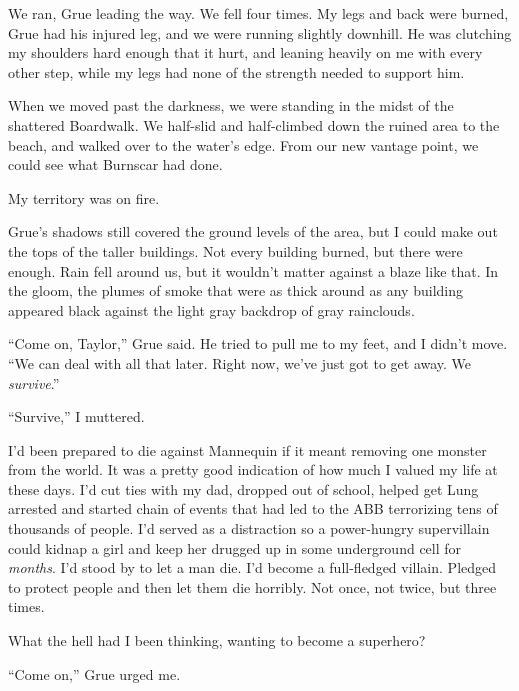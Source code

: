 We ran, Grue leading the way.  We fell four times.  My legs and back were burned, Grue had his injured leg, and we were running slightly downhill.  He was clutching my shoulders hard enough that it hurt, and leaning heavily on me with every other step, while my legs had none of the strength needed to support him.



When we moved past the darkness, we were standing in the midst of the shattered Boardwalk.  We half-slid and half-climbed down the ruined area to the beach, and walked over to the water's edge.  From our new vantage point, we could see what Burnscar had done.



My territory was on fire.



Grue's shadows still covered the ground levels of the area, but I could make out the tops of the taller buildings.  Not every building burned, but there were enough.  Rain fell around us, but it wouldn't matter against a blaze like that.  In the gloom, the plumes of smoke that were as thick around as any building appeared black against the light gray backdrop of gray rainclouds.



``Come on, Taylor,'' Grue said.  He tried to pull me to my feet, and I didn't move.  ``We can deal with all that later.  Right now, we've just got to get away.  We \emph{survive}.''



``Survive,'' I muttered.



I'd been prepared to die against Mannequin if it meant removing one monster from the world.  It was a pretty good indication of how much I valued my life at these days.  I'd cut ties with my dad, dropped out of school, helped get Lung arrested and started chain of events that had led to the ABB terrorizing tens of thousands of people.  I'd served as a distraction so a power-hungry supervillain could kidnap a girl and keep her drugged up in some underground cell for \emph{months}.  I'd stood by to let a man die.  I'd become a full-fledged villain.  Pledged to protect people and then let them die horribly.  Not once, not twice, but three times.



What the hell had I been thinking, wanting to become a superhero?



``Come on,'' Grue urged me.



